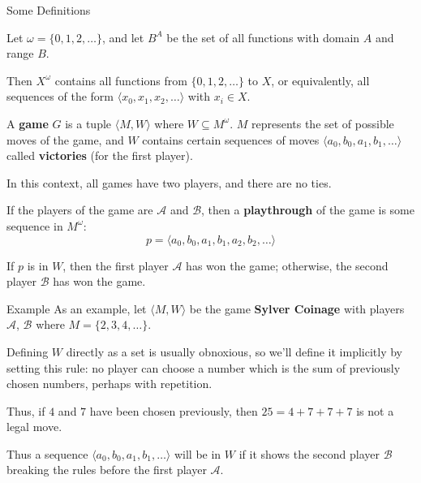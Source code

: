 \documentclass{beamer}
\theoremstyle{theorem}
\theoremstyle{definition}
\newcommand{\<}{\langle}
\renewcommand{\>}{\rangle}
\newcommand{\pl}[1]{\mathscr{#1}}
\newcommand{\vpause}{\pause\vspace{1em}}
\newcommand{\term}[1]{\textbf{#1}}
\begin{document}
\begin{frame}{Some Definitions}
  \begin{definition}
    Let $\omega=\{0,1,2,\dots\}$, and let $B^A$ be the set of all functions
    with domain $A$ and range $B$.

    Then $X^\omega$ contains all functions from $\{0,1,2,\dots\}$ to $X$, or
    equivalently, all sequences of the form $\<x_0,x_1,x_2,\dots\>$ with
    $x_i\in X$.
  \end{definition}
  \pause
  \begin{definition}
    A \term{game} $G$ is a tuple $\<M,W\>$ where $W\subseteq M^\omega$.
    $M$ represents the set of possible moves of the game, and $W$ contains
    certain sequences of moves $\<a_0,b_0,a_1,b_1,\dots\>$ called
    \term{victories} (for the first player).
  \end{definition}
\end{frame}

\begin{frame}
  In this context, all games have two players, and there are no ties.

  \vpause

  If the players of the game are $\pl A$ and $\pl B$, then a \term{playthrough}
  of the game is some sequence in $M^\omega$:
  \[
    p=\<a_0,b_0,a_1,b_1,a_2,b_2,\dots\>
  \]

  \pause

  If $p$ is in $W$, then the first player $\pl A$ has won the game; otherwise,
  the second player $\pl B$ has won the game.
\end{frame}

\begin{frame}{Example}
  As an example, let $\<M,W\>$ be the game \term{Sylver Coinage} with players
  $\pl A$, $\pl B$ where $M=\{2,3,4,\dots\}$.

  \vpause

  Defining $W$ directly as a set is usually obnoxious, so we'll define it
  implicitly by setting this rule: no player can choose a number which is
  the sum of previously chosen numbers, perhaps with repetition.

  \vpause

  Thus, if $4$ and $7$ have been chosen previously, then $25=4+7+7+7$ is not a
  legal move.

  \vpause

  Thus a sequence $\<a_0,b_0,a_1,b_1,\dots\>$ will be in $W$ if it shows the
  second player $\pl B$ breaking the rules before the first player $\pl A$.
\end{frame}
\end{document}
